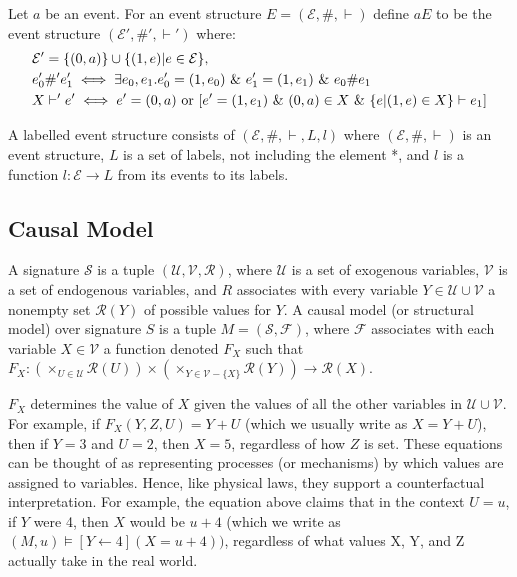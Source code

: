 \begin{definition}
    Let $a$ be an event.
    For an event structure $E = (\mathcal{E},\#,\vdash)$ define $aE$ to be the event structure $(\mathcal{E'},\#',\vdash')$ where:
    \begin{align*}
         & \mathcal{E'} = \s{(0,a)} \cup \s{(1,e)|e \in \mathcal{E}},                                                   \\
         & e_0' \#' e_1'  \iff \exists e_0,e_1.e_0' = (1,e_0)
        \ \& \ e_1' = (1,e_1) \ \& \ e_0 \# e_1                                                                         \\
         & X \vdash' e' \iff e' = (0,a) \text{ or } [e' = (1,e_1) \ \& \ (0,a)\in X \ \& \ \s{e|(1,e)\in X} \vdash e_1]
    \end{align*}
\end{definition}

\begin{definition}
    A labelled event structure consists of $(\mathcal{E},\#,\vdash,L,l)$ where
    $(\mathcal{E},\#,\vdash)$ is an event structure, $L$ is a set of labels,
    not including the element *, and $l$ is a function $l: \mathcal{E} \rightarrow L$
    from its events to its labels.
\end{definition}
\subsection{Causal Model}

A signature $\mathcal{S}$ is a tuple $(\mathcal{U},\mathcal{V},\mathcal{R})$,
where $\mathcal{U}$ is a set of exogenous variables, $\mathcal{V}$
is a set of endogenous variables, and $R$ associates with every variable
$Y\in \mathcal{U}\cup \mathcal{V}$ a nonempty set $\mathcal{R}(Y)$ of possible values for $Y$.
A causal model (or structural model) over signature $S$ is a tuple
$M=(\mathcal{S},\mathcal{F})$, where $\mathcal{F}$ associates with
each variable $X \in \mathcal{V}$ a function denoted $F_X$ such that
$F_X: (\times_{U\in \mathcal{U}}\mathcal{R}(U))\times (\times_{Y\in\mathcal{V}-\{X\}}\mathcal{R}(Y))\rightarrow \mathcal{R}(X)$.

$F_X$ determines the value of $X$ given the values of all the other variables
in $\mathcal{U}\cup \mathcal{V}$.
For example, if $F_X(Y,Z,U)=Y+U$ (which we usually write as $X = Y + U$),
then if $Y=3$ and $U=2$, then $X = 5$, regardless of how $Z$ is set.
These equations can be thought of as representing processes (or mechanisms) by which values are assigned to variables. Hence, like physical laws, they support a counterfactual interpretation.
For example, the equation above claims that in the context $U=u$, if $Y$ were 4, then $X$ would be $u+4$ (which we write as $(M,u) \models [Y\leftarrow 4](X = u + 4))$, regardless of what values X, Y, and Z actually take in the real world.


